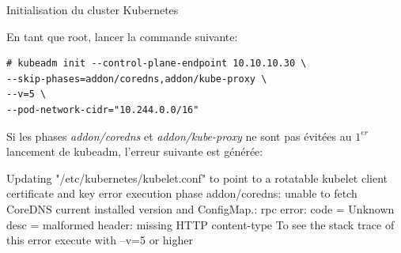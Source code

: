 \begin{frame}[fragile]{Initialisation du cluster Kubernetes}

En tant que root, lancer la commande suivante:

\begin{tiny}
\begin{Verbatim}[commandchars=\&\@\@]
# kubeadm init --control-plane-endpoint 10.10.10.30 \
--skip-phases=addon/coredns,addon/kube-proxy \
--v=5 \
--pod-network-cidr="10.244.0.0/16"
\end{Verbatim}
\end{tiny}

Si les phases \textit{addon/coredns} et \textit{addon/kube-proxy} ne sont pas évitées au $1^{er}$ lancement de kubeadm, l'erreur suivante est générée:

\begin{toile}
[kubelet-finalize] Updating "/etc/kubernetes/kubelet.conf" to point to a rotatable kubelet client certificate and key
error execution phase addon/coredns: unable to fetch CoreDNS current installed version and ConfigMap.: rpc error: code = Unknown desc = malformed header: missing HTTP content-type
To see the stack trace of this error execute with --v=5 or higher
\end{toile}

\end{frame}


